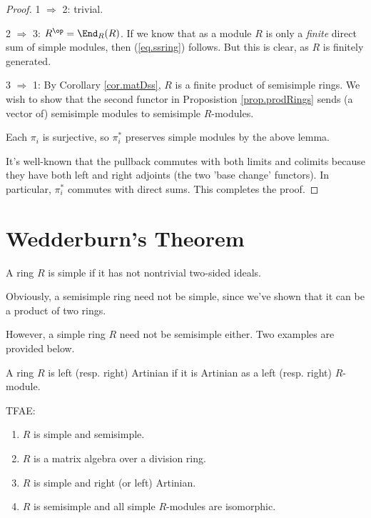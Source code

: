 \documentclass{article}
\begin{document}
\begin{proof}
    1 $\Rightarrow$ 2: trivial.

    2 $\Rightarrow$ 3: $R^\op=\End_R(R)$. If we know that as a module $R$ is only a \emph{finite} direct sum of simple modules, then (\ref{eq.ssring}) follows. But this is clear, as $R$ is finitely generated.

    3 $\Rightarrow$ 1: By Corollary \ref{cor.matDss}, $R$ is a finite product of semisimple rings.
    We wish to show that the second functor in Proposistion \ref{prop.prodRings} sends (a vector of) semisimple modules to semisimple $R$-modules.
    
    Each $\pi_i$ is surjective, so $\pi_i^*$ preserves simple modules by the above lemma.

    It's well-known that the pullback commutes with both limits and colimits because they have both left and right adjoints (the two 'base change' functors). In particular, $\pi_i^*$ commutes with direct sums.
    This completes the proof.
\end{proof}

\section{Wedderburn's Theorem}

\begin{definition}
    A ring $R$ is simple if it has not nontrivial two-sided ideals.
\end{definition}

\begin{remark}
    Obviously, a semisimple ring need not be simple, since we've shown that it can be a product of two rings.

    However, a simple ring $R$ need not be semisimple either.
    Two examples are provided below.
\end{remark}

\begin{definition}
    A ring $R$ is left (resp. right) Artinian if it is Artinian as a left (resp. right) $R$-module.
\end{definition}

\begin{theorem}[Wedderburn]
    TFAE:
    \begin{enumerate}[nosep]
        \item $R$ is simple and semisimple.
        \item $R$ is a matrix algebra over a division ring.
        \item $R$ is simple and right (or left) Artinian.
        \item $R$ is semisimple and all simple $R$-modules are isomorphic.
    \end{enumerate} 
\end{theorem}
\end{document}
